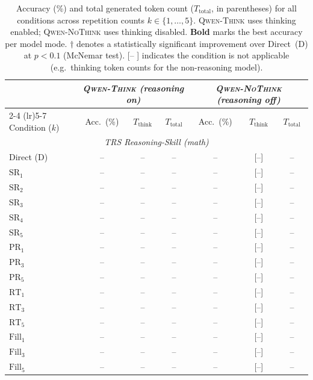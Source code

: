 \begin{table}[t]
  \caption{%
    Accuracy (\%) and total generated token count ($T_\mathrm{total}$, in parentheses)
    for all conditions across repetition counts $k \in \{1,\ldots,5\}$.
    \textsc{Qwen-Think} uses thinking enabled; \textsc{Qwen-NoThink} uses thinking
    disabled.
    \textbf{Bold} marks the best accuracy per model mode.
    $\dagger$ denotes a statistically significant improvement over Direct~(D)
    at $p < 0.1$ (McNemar test).
    [-- ] indicates the condition is not applicable (e.g.\ thinking token counts for
    the non-reasoning model).
  }
  \label{tab:main-results}
  \vskip 0.15in
  \begin{center}
  \begin{small}
  \begin{tabular}{lcccccc}
    \toprule
    & \multicolumn{3}{c}{\textit{\textsc{Qwen-Think} (reasoning on)}}
    & \multicolumn{3}{c}{\textit{\textsc{Qwen-NoThink} (reasoning off)}} \\
    \cmidrule(lr){2-4} \cmidrule(lr){5-7}
    Condition ($k$)
      & Acc.\ (\%) & $T_\mathrm{think}$ & $T_\mathrm{total}$
      & Acc.\ (\%) & $T_\mathrm{think}$ & $T_\mathrm{total}$ \\
    \midrule
    \multicolumn{7}{c}{\textit{TRS Reasoning-Skill (math)}} \\
    Direct (D)            & --   & --  & --  & --   & {[--]} & --  \\
    $\mathrm{SR}_1$       & --   & --  & --  & --   & {[--]} & --  \\
    $\mathrm{SR}_2$       & --   & --  & --  & --   & {[--]} & --  \\
    $\mathrm{SR}_3$       & --   & --  & --  & --   & {[--]} & --  \\
    $\mathrm{SR}_4$       & --   & --  & --  & --   & {[--]} & --  \\
    $\mathrm{SR}_5$       & --   & --  & --  & --   & {[--]} & --  \\
    \midrule
    $\mathrm{PR}_1$       & --   & --  & --  & --   & {[--]} & --  \\
    $\mathrm{PR}_3$       & --   & --  & --  & --   & {[--]} & --  \\
    $\mathrm{PR}_5$       & --   & --  & --  & --   & {[--]} & --  \\
    \midrule
    $\mathrm{RT}_1$       & --   & --  & --  & --   & {[--]} & --  \\
    $\mathrm{RT}_3$       & --   & --  & --  & --   & {[--]} & --  \\
    $\mathrm{RT}_5$       & --   & --  & --  & --   & {[--]} & --  \\
    \midrule
    $\mathrm{Fill}_1$     & --   & --  & --  & --   & {[--]} & --  \\
    $\mathrm{Fill}_3$     & --   & --  & --  & --   & {[--]} & --  \\
    $\mathrm{Fill}_5$     & --   & --  & --  & --   & {[--]} & --  \\
    \bottomrule
  \end{tabular}
  \end{small}
  \end{center}
  \vskip -0.1in
\end{table}

